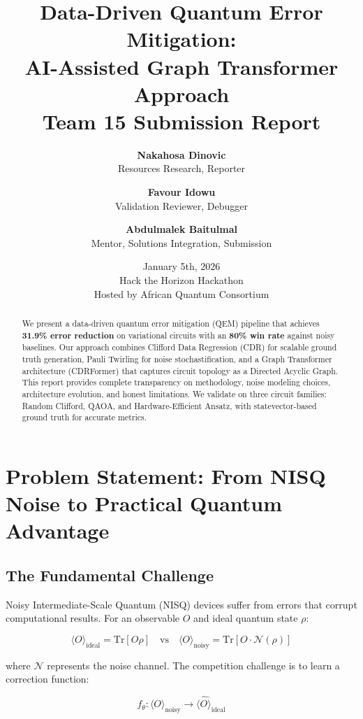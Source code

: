 \documentclass[11pt, a4paper]{article}
\title{\textbf{Data-Driven Quantum Error Mitigation: \\ AI-Assisted Graph Transformer Approach} \\ \large Team 15 Submission Report}
\author{
\textbf{Nakahosa Dinovic} \\ Resources Research, Reporter \\
\and
\textbf{Favour Idowu} \\ Validation Reviewer, Debugger \\
\and
\textbf{Abdulmalek Baitulmal} \\ Mentor, Solutions Integration, Submission
}
\date{January 5th, 2026 \\ \small Hack the Horizon Hackathon \\ Hosted by African Quantum Consortium}
\begin{document}
\maketitle

\begin{abstract}
We present a data-driven quantum error mitigation (QEM) pipeline that achieves \textbf{31.9\% error reduction} on variational circuits with an \textbf{80\% win rate} against noisy baselines. Our approach combines Clifford Data Regression (CDR) for scalable ground truth generation, Pauli Twirling for noise stochastification, and a Graph Transformer architecture (CDRFormer) that captures circuit topology as a Directed Acyclic Graph. This report provides complete transparency on methodology, noise modeling choices, architecture evolution, and honest limitations. We validate on three circuit families: Random Clifford, QAOA, and Hardware-Efficient Ansatz, with statevector-based ground truth for accurate metrics.
\end{abstract}

\tableofcontents
\newpage

\section{Problem Statement: From NISQ Noise to Practical Quantum Advantage}

\subsection{The Fundamental Challenge}

Noisy Intermediate-Scale Quantum (NISQ) devices suffer from errors that corrupt computational results. For an observable $O$ and ideal quantum state $\rho$:

\begin{equation}
\langle O \rangle_{\text{ideal}} = \text{Tr}[O\rho] \quad \text{vs} \quad \langle O \rangle_{\text{noisy}} = \text{Tr}[O \cdot \mathcal{N}(\rho)]
\end{equation}

where $\mathcal{N}$ represents the noise channel. The competition challenge is to learn a correction function:

\begin{equation}
f_\theta: \langle O \rangle_{\text{noisy}} \rightarrow \hat{\langle O \rangle}_{\text{ideal}}
\end{equation}
\end{document}

